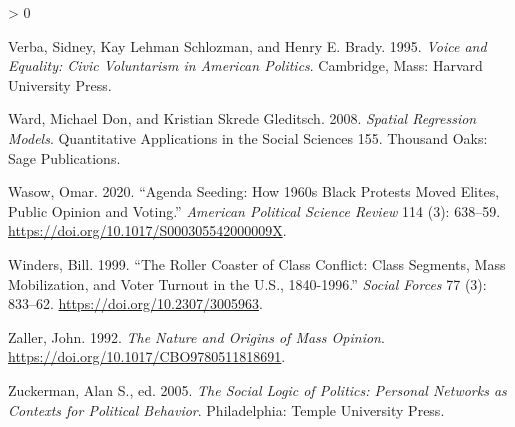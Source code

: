 \documentclass[
  12pt,
]{article}
\newlength{\cslhangindent}
\newenvironment{CSLReferences}[2] %
 {%
  \setlength{\parindent}{0pt}
  \ifodd #1 \everypar{\setlength{\hangindent}{\cslhangindent}}\ignorespaces\fi
  \ifnum #2 > 0
  \setlength{\parskip}{#2\baselineskip}
  \fi
 }%
 {}
\begin{document}
\begin{CSLReferences}{1}{0}
\leavevmode\hypertarget{ref-Verba1995}{}%
Verba, Sidney, Kay Lehman Schlozman, and Henry E. Brady. 1995. \emph{Voice and Equality: Civic Voluntarism in {American} Politics}. {Cambridge, Mass}: {Harvard University Press}.

\leavevmode\hypertarget{ref-Ward2008}{}%
Ward, Michael Don, and Kristian Skrede Gleditsch. 2008. \emph{Spatial Regression Models}. Quantitative Applications in the Social Sciences 155. {Thousand Oaks}: {Sage Publications}.

\leavevmode\hypertarget{ref-Wasow2020}{}%
Wasow, Omar. 2020. {``Agenda {Seeding}: {How} 1960s {Black Protests Moved Elites}, {Public Opinion} and {Voting}.''} \emph{American Political Science Review} 114 (3): 638--59. \url{https://doi.org/10.1017/S000305542000009X}.

\leavevmode\hypertarget{ref-Winders1999}{}%
Winders, Bill. 1999. {``The {Roller Coaster} of {Class Conflict}: {Class Segments}, {Mass Mobilization}, and {Voter Turnout} in the {U}.{S}., 1840-1996.''} \emph{Social Forces} 77 (3): 833--62. \url{https://doi.org/10.2307/3005963}.

\leavevmode\hypertarget{ref-Zaller1992}{}%
Zaller, John. 1992. \emph{The Nature and Origins of Mass Opinion}. \url{https://doi.org/10.1017/CBO9780511818691}.

\leavevmode\hypertarget{ref-Zuckerman2005}{}%
Zuckerman, Alan S., ed. 2005. \emph{The Social Logic of Politics: Personal Networks as Contexts for Political Behavior}. {Philadelphia}: {Temple University Press}.

\end{CSLReferences}
\end{document}
